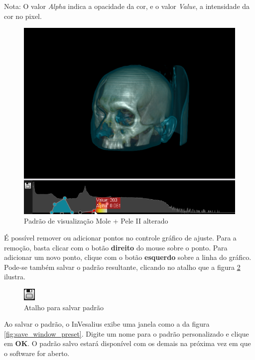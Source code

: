 Nota: O valor \textit{Alpha} indica a opacidade da cor, e o valor \textit{Value}, a
intensidade da cor no pixel.

\begin{figure}[!htb]
\centering
\includegraphics[scale=0.6]{../user_guide_figures/invesalius_screen/customize_2.png}
\caption{Padrão de visualização Mole + Pele II alterado}
\label{fig:customize_2}
\end{figure}


\newpage


É possível remover ou adicionar pontos no controle gráfico de ajuste. Para a remoção, basta clicar
com o botão \textbf{direito} do mouse sobre o ponto. Para adicionar um novo ponto, clique com
o botão \textbf{esquerdo} sobre a linha do gráfico. Pode-se também salvar o padrão resultante,
clicando no atalho que a figura \ref{fig:save_preset} ilustra.

\begin{figure}[!htb]
\centering
\includegraphics[scale=0.6]{../user_guide_figures/invesalius_screen/save_preset.png}
\caption{Atalho para salvar padrão}
\label{fig:save_preset}
\end{figure}
 
Ao salvar o padrão, o InVesalius exibe uma janela como a da figura \ref{fig:save_window_preset}.
Digite um nome para o padrão personalizado e clique em \textbf{OK}. O padrão salvo estará
disponível com os demais na próxima vez em que o software for aberto.


